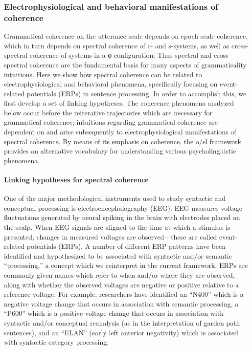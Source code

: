 \subsubsection{Electrophysiological and behavioral manifestations of coherence}

Grammatical coherence on the utterance scale depends on epoch scale coherence, which in turn depends on spectral coherence of c- and s-systems, as well as cross-spectral coherence of systems in a φ configuration. Thus spectral and cross-spectral coherence are the fundamental basis for many aspects of grammaticality intuitions. Here we show how spectral coherence can be related to electrophysiological and behavioral phenomena, specifically focusing on event-related potentials (ERPs) in sentence processing. In order to accomplish this, we first develop a set of linking hypotheses. The coherence phenomena analyzed below occur before the reiterative trajectories which are necessary for grammatical coherence; intuitions regarding grammatical coherence are dependent on and arise subsequently to electrophysiological manifestations of spectral coherence. By means of its emphasis on coherence, the o/el framework provides an alternative vocabulary for understanding various psycholinguistic phenomena.

\paragraph{Linking hypotheses for spectral coherence}

One of the major methodological instruments used to study syntactic and conceptual processing is electroencephalography (EEG). EEG measures voltage fluctuations generated by neural spiking in the brain with electrodes placed on the scalp. When EEG signals are aligned to the time at which a stimulus is presented, changes in measured voltages are observed—these are called event-related potentials (ERPs). A number of different ERP patterns have been identified and hypothesized to be associated with syntactic and/or semantic “processing,” a concept which we reinterpret in the current framework. ERPs are commonly given names which refer to when and/or where they are observed, along with whether the observed voltages are negative or positive relative to a reference voltage. For example, researchers have identified an “N400” which is a negative voltage change that occurs in association with semantic processing, a “P600” which is a positive voltage change that occurs in association with syntactic and/or conceptual reanalysis (as in the interpretation of garden path sentences), and an “ELAN” (early left anterior negativity) which is associated with syntactic category processing. 

